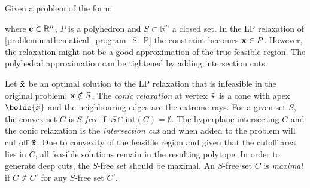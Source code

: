 Given a problem of the form:
where $\bold c \in \mathbb{R}^n$, $P$ is a polyhedron and $S \subset \mathbb{R}^n$ a closed set. In the LP relaxation of \cref{problem:mathematical_program_S_P} the constraint becomes $\bold x \in P$. However, the relaxation might not be a good approximation of the true feasible region. The polyhedral approximation 
can be tightened by adding intersection cuts. 
\cite{bienstock_outer_product_free_sets}


Let $\bold{\tilde x}$ be an optimal solution to the LP relaxation that is infeasible in the original problem: $\bold x \notin S$. %
The \textit{conic relaxation} at vertex $\bold{\tilde x}$ is a cone with apex $\bolde{\tilde x}$ and the neighbouring edges are the extreme rays. For a given set $S$, the convex set $C$ is \textit{$S$-free} if: $S \cap \text{int}(C) = \emptyset$. \cite{bienstock_outer_product_free_sets} The hyperplane intersecting $C$ and the conic relaxation is the \textit{intersection cut} and when added to the problem will cut off $\bold{\tilde x}$. Due to convexity of the feasible region and given that the cutoff area lies in $C$, all feasible solutions remain in the resulting polytope. \cite{musalem_intersection_cuts}
In order to generate deep cuts, the $S$-free set should be maximal. An $S$-free set $C$ is \textit{maximal} if $C \not \subset C'$ for any $S$-free set $C'$. \cite{bienstock_outer_product_free_sets}

